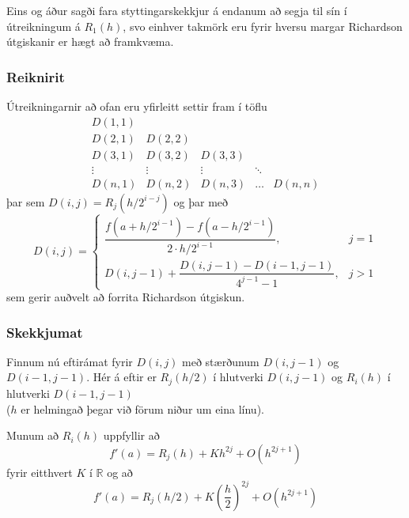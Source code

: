 \documentclass[icelandic,a4paper,12pt]{article}
\begin{document}
\pause 
\smallskip
Eins og áður sagði fara styttingarskekkjur á endanum að
segja til sín í útreikningum á $R_1(h)$, svo einhver takmörk eru fyrir
hversu margar Richardson útgiskanir er hægt að framkvæma. 



\subsubsection{Reiknirit} 
Útreikningarnir að ofan eru yfirleitt settir fram í töflu
\begin{equation*}
  \begin{array}{ccccc}
    D(1,1) &   &   &   &   \\
    D(2,1) & D(2,2) &  &  &  \\
    D(3,1) & D(3,2) & D(3,3) & & \\
    \vdots & \vdots & \vdots & \ddots & \\
    D(n,1) & D(n,2) & D(n,3) & \ldots & D(n,n)
  \end{array}
\end{equation*}
þar sem $D(i,j) = R_j(h/2^{i-j})$ og þar með
\begin{equation*}
  D(i,j) = \begin{cases}
    \dfrac{f(a+h/2^{i-1})-f(a-h/2^{i-1})}{2\cdot h/2^{i-1}}, & j = 1 \\
    D(i,j-1) + \dfrac{D(i,j-1)-D(i-1,j-1)}{4^{j-1}-1}, & j > 1
  \end{cases}
\end{equation*}
sem gerir auðvelt að forrita Richardson útgiskun. 



\subsubsection{Skekkjumat}
Finnum nú eftirámat fyrir $D(i,j)$ með stærðunum 
$D(i,j-1)$ og $D(i-1,j-1)$. Hér á eftir er $R_j(h/2)$ í hlutverki $D(i,j-1)$ og 
$R_i(h)$ í hlutverki $D(i-1,j-1)$ \\
($h$ er helmingað þegar við förum niður um eina línu).

\pause
\smallskip
Munum að $R_i(h)$ uppfyllir að
\begin{equation*}
  f'(a) = R_j(h) + Kh^{2j} + O(h^{2j+1})
\end{equation*}
fyrir eitthvert $K$ í $\mathbb R$ og að
\begin{equation*}
  f'(a) = R_j(h/2) + K \left( \frac{h}{2} \right)^{2j}
  + O(h^{2j+1})
\end{equation*}
\end{document}
